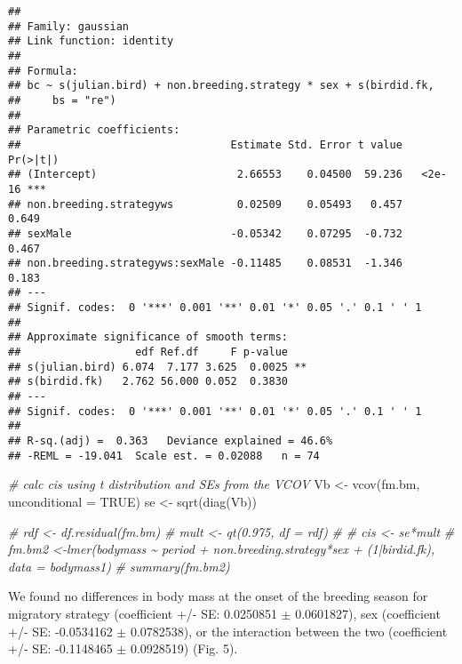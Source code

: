 \documentclass[
]{article}
\newenvironment{Shaded}{\begin{snugshade}}{\end{snugshade}}
\newcommand{\AttributeTok}[1]{\textcolor[rgb]{0.77,0.63,0.00}{#1}}
\newcommand{\CommentTok}[1]{\textcolor[rgb]{0.56,0.35,0.01}{\textit{#1}}}
\newcommand{\ConstantTok}[1]{\textcolor[rgb]{0.00,0.00,0.00}{#1}}
\newcommand{\FunctionTok}[1]{\textcolor[rgb]{0.00,0.00,0.00}{#1}}
\newcommand{\NormalTok}[1]{#1}
\newcommand{\OtherTok}[1]{\textcolor[rgb]{0.56,0.35,0.01}{#1}}
\begin{document}
\begin{verbatim}
## 
## Family: gaussian 
## Link function: identity 
## 
## Formula:
## bc ~ s(julian.bird) + non.breeding.strategy * sex + s(birdid.fk, 
##     bs = "re")
## 
## Parametric coefficients:
##                                 Estimate Std. Error t value Pr(>|t|)    
## (Intercept)                      2.66553    0.04500  59.236   <2e-16 ***
## non.breeding.strategyws          0.02509    0.05493   0.457    0.649    
## sexMale                         -0.05342    0.07295  -0.732    0.467    
## non.breeding.strategyws:sexMale -0.11485    0.08531  -1.346    0.183    
## ---
## Signif. codes:  0 '***' 0.001 '**' 0.01 '*' 0.05 '.' 0.1 ' ' 1
## 
## Approximate significance of smooth terms:
##                  edf Ref.df     F p-value   
## s(julian.bird) 6.074  7.177 3.625  0.0025 **
## s(birdid.fk)   2.762 56.000 0.052  0.3830   
## ---
## Signif. codes:  0 '***' 0.001 '**' 0.01 '*' 0.05 '.' 0.1 ' ' 1
## 
## R-sq.(adj) =  0.363   Deviance explained = 46.6%
## -REML = -19.041  Scale est. = 0.02088   n = 74
\end{verbatim}

\begin{Shaded}
\begin{Highlighting}[]
\CommentTok{\# calc cis using t distribution and SEs from the VCOV}
\NormalTok{Vb }\OtherTok{\textless{}{-}} \FunctionTok{vcov}\NormalTok{(fm.bm, }\AttributeTok{unconditional =} \ConstantTok{TRUE}\NormalTok{)}
\NormalTok{se }\OtherTok{\textless{}{-}} \FunctionTok{sqrt}\NormalTok{(}\FunctionTok{diag}\NormalTok{(Vb))}

\CommentTok{\# rdf \textless{}{-} df.residual(fm.bm)}
\CommentTok{\# mult \textless{}{-} qt(0.975, df = rdf)}
\CommentTok{\# }
\CommentTok{\# cis \textless{}{-} se*mult}
\CommentTok{\# fm.bm2 \textless{}{-}lmer(bodymass \textasciitilde{} period + non.breeding.strategy*sex + (1|birdid.fk), data = bodymass1)}
\CommentTok{\# summary(fm.bm2)}
\end{Highlighting}
\end{Shaded}

We found no differences in body mass at the onset of the breeding season
for migratory strategy (coefficient +/- SE: 0.0250851 \(\pm\)
0.0601827), sex (coefficient +/- SE: -0.0534162 \(\pm\) 0.0782538), or
the interaction between the two (coefficient +/- SE: -0.1148465 \(\pm\)
0.0928519) (Fig. 5).
\end{document}
